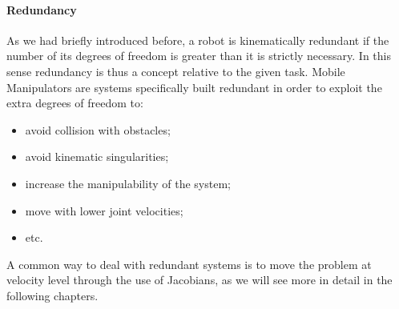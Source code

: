 \paragraph{Redundancy}
As we had briefly introduced before, a robot is kinematically redundant if the number of its degrees of freedom is greater than it is strictly necessary. In this sense redundancy is thus a concept relative to the given task. Mobile Manipulators are systems specifically built redundant in order to exploit the extra degrees of freedom to:
\begin{itemize}
	\item avoid collision with obstacles;
	\item avoid kinematic singularities;
	\item increase the manipulability of the system;
	\item move with lower joint velocities;
	\item etc.
\end{itemize}
A common way to deal with redundant systems is to move the problem at velocity level through the use of Jacobians, as we will see more in detail in the following chapters. 
